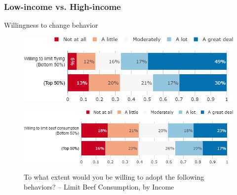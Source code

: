 \begin{framefont}{\small}
\subsubsection{Low-income vs. High-income}
\begin{frame}{Willingness to change behavior}%
\vspace{-.5cm}
\begin{figure}[h!]
\caption{To what extent would you be willing to adopt the following behaviors? -– Limit Flying, by Income}
\includegraphics[width=.52\paperwidth]{../figures/FR/willing_limit_flying_FR_inc.png} \\
\vspace{.5cm}
\caption{To what extent would you be willing to adopt the following behaviors? -- Limit Beef Consumption, by Income}
\includegraphics[width=.61\paperwidth]{../figures/FR/willing_limit_beef_FR_inc.png} \\
\end{figure}
\end{frame}


\end{framefont}
